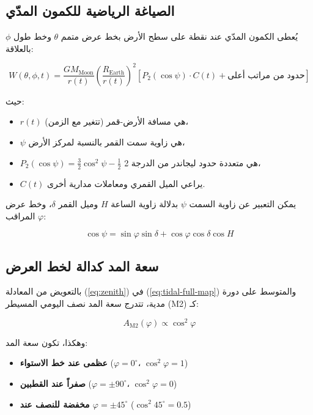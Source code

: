 \documentclass[11pt,a4paper]{article}
\theoremstyle{remark}
\begin{document}
	\subsection{الصياغة الرياضية للكمون المدّي}
	
	يُعطى الكمون المدّي عند نقطة على سطح الأرض بخط عرض متمم $\theta$ وخط طول $\phi$ بالعلاقة:
	
	\begin{equation}
		W(\theta, \phi, t) = \frac{GM_{\text{Moon}}}{r(t)} \left(\frac{R_{\text{Earth}}}{r(t)}\right)^2 \left[ P_2(\cos\psi) \cdot C(t) + \text{حدود من مراتب أعلى} \right]
		\label{eq:tidal-full-map}
	\end{equation}
	
	حيث:
	\begin{itemize}
		\item $r(t)$ هي مسافة الأرض-قمر (تتغير مع الزمن)،
		\item $\psi$ هي زاوية سمت القمر بالنسبة لمركز الأرض،
		\item $P_2(\cos\psi) = \frac{3}{2}\cos^2\psi - \frac{1}{2}$ هي متعددة حدود ليجاندر من الدرجة 2،
		\item $C(t)$ يراعي الميل القمري ومعاملات مدارية أخرى.
	\end{itemize}
	
	يمكن التعبير عن زاوية السمت $\psi$ بدلالة زاوية الساعة $H$ وميل القمر $\delta$، وخط عرض المراقب $\varphi$:
	
	\begin{equation}
		\cos\psi = \sin\varphi \sin\delta + \cos\varphi \cos\delta \cos H
		\label{eq:zenith}
	\end{equation}
	
	\subsection{سعة المد كدالة لخط العرض}
	
	بالتعويض من المعادلة (\ref{eq:zenith}) في (\ref{eq:tidal-full-map}) والمتوسط على دورة مدية، تتدرج سعة المد نصف اليومي المسيطر (M2) كـ:
	
	\begin{equation}
		A_{\text{M2}}(\varphi) \propto \cos^2\varphi
		\label{eq:amplitude-latitude}
	\end{equation}
	
	وهكذا، تكون سعة المد:
	\begin{itemize}
		\item \textbf{عظمى عند خط الاستواء} ($\varphi = 0^\circ$، $\cos^2\varphi = 1$)
		\item \textbf{صفراً عند القطبين} ($\varphi = \pm 90^\circ$، $\cos^2\varphi = 0$)
		\item \textbf{مخفضة للنصف عند $\varphi = \pm 45^\circ$} ($\cos^2 45^\circ = 0.5$)
	\end{itemize}
	
\end{document}
